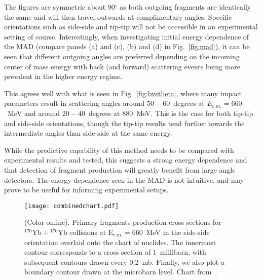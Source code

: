 \documentclass[reprint,aps,prc,twocolumn,superscriptaddress,floatfix,10pt]{revtex4-2}
\begin{document}

 
The figures are symmetric about 90$^{\circ}$ as both outgoing fragments are identically the same and will then travel outwards at complimentary angles.
Specific orientations such as side-side and tip-tip will not be accessible in an experimental setting of course.
Interestingly, when investigating initial energy dependence of the MAD (compare panels (a) and (c), (b) and (d) in Fig.~\ref{fig:mad}), 
it can be seen that different outgoing angles are preferred depending on the incoming center of mass energy with back (and forward) scattering events being more prevalent in the higher energy regime.

This  agrees well with what is seen in Fig.~\ref{fig:bvstheta}, where many impact parameters result in  scattering angles around $50-60$~degrees at $E_{c.m.}=660$~MeV and around $20-40$~degrees at 880~MeV.
This is the case for both tip-tip and side-side orientations, though the tip-tip results tend further towards the intermediate angles than side-side at the same energy.

While the predictive capability of this method needs to be compared with experimental results and tested, this suggests a strong energy dependence and that detection of fragment production will greatly benefit from large angle detectors.
The energy dependence seen in the MAD is not intuitive, and may prove to be useful for informing experimental setups.
\begin{figure*}[htb]
	\texttt{[image: combinedchart.pdf]}
	\caption{\protect(Color online). Primary fragments production cross sections for $^{176}\mathrm{Yb}+{}^{176}\mathrm{Yb}$ collisions at $\mathrm{E_{c.m.}}=660$~MeV in the side-side orientation overlaid onto the chart of nuclides. 
	The innermost contour corresponds to a cross section of 1~millibarn, with subsequent contours drawn every 0.2~mb.
	Finally, we also plot a boundary contour drawn at the microbarn level. Chart from~\cite{anu_chart}.}
	\label{fig:chart}
\end{figure*}
\end{document}
